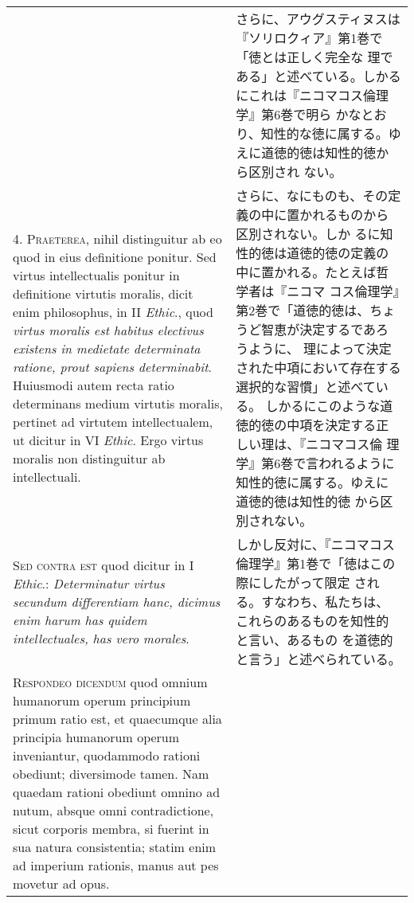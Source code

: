 \documentclass[10pt]{jsarticle}
\begin{document}
\begin{longtable}{p{21em}p{21em}}
&

 さらに、アウグスティヌスは『ソリロクィア』第1巻で「徳とは正しく完全な
 理である」と述べている。しかるにこれは『ニコマコス倫理学』第6巻で明ら
 かなとおり、知性的な徳に属する。ゆえに道徳的徳は知性的徳から区別され
 ない。
 
\\



4. {\scshape Praeterea}, nihil distinguitur ab eo quod in eius
definitione ponitur. Sed virtus intellectualis ponitur in definitione
virtutis moralis, dicit enim philosophus, in II {\itshape Ethic}.,
quod {\itshape virtus moralis est habitus electivus existens in
medietate determinata ratione, prout sapiens determinabit}. Huiusmodi
autem recta ratio determinans medium virtutis moralis, pertinet ad
virtutem intellectualem, ut dicitur in VI {\itshape Ethic}. Ergo
virtus moralis non distinguitur ab intellectuali.

&

 さらに、なにものも、その定義の中に置かれるものから区別されない。しか
 るに知性的徳は道徳的徳の定義の中に置かれる。たとえば哲学者は『ニコマ
 コス倫理学』第2巻で「道徳的徳は、ちょうど智恵が決定するであろうように、
 理によって決定された中項において存在する選択的な習慣」と述べている。
 しかるにこのような道徳的徳の中項を決定する正しい理は、『ニコマコス倫
 理学』第6巻で言われるように知性的徳に属する。ゆえに道徳的徳は知性的徳
 から区別されない。
 
\\


{\scshape Sed contra est} quod dicitur in I {\itshape Ethic}.:
{\itshape Determinatur virtus secundum differentiam hanc, dicimus enim
harum has quidem intellectuales, has vero morales}.

&

 しかし反対に、『ニコマコス倫理学』第1巻で「徳はこの際にしたがって限定
 される。すなわち、私たちは、これらのあるものを知性的と言い、あるもの
 を道徳的と言う」と述べられている。


 \\



 {\scshape Respondeo dicendum} quod omnium humanorum operum principium
 primum ratio est, et quaecumque alia principia humanorum operum
 inveniantur, quodammodo rationi obediunt; diversimode tamen. Nam
 quaedam rationi obediunt omnino ad nutum, absque omni contradictione,
 sicut corporis membra, si fuerint in sua natura consistentia; statim
 enim ad imperium rationis, manus aut pes movetur ad opus.



\end{longtable}
\end{document}
